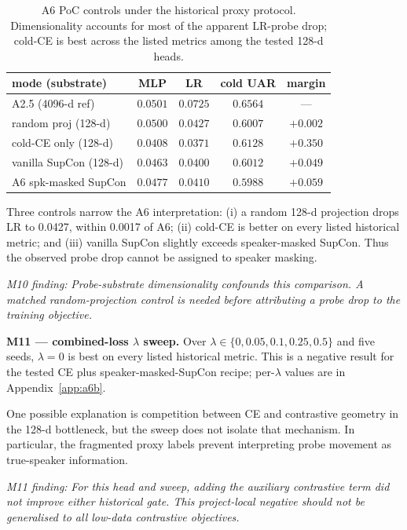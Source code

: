 \begin{table}[t]
\centering\small
\caption{A6 PoC controls under the historical proxy protocol. Dimensionality accounts for most of the apparent LR-probe drop; cold-CE is best across the listed metrics among the tested 128-d heads.}
\label{tab:a6_controls}
\begin{tabular}{lcccc}
\toprule
mode (substrate)        & MLP   & LR    & cold UAR & margin \\
\midrule
A2.5 (4096-d ref)       & $0.0501$ & $0.0725$ & $0.6564$ & --- \\
random proj (128-d)     & $0.0500$ & $0.0427$ & $0.6007$ & $+0.002$ \\
cold-CE only (128-d)    & $0.0408$ & $\mathbf{0.0371}$ & $\mathbf{0.6128}$ & $\mathbf{+0.350}$ \\
vanilla SupCon (128-d)  & $0.0463$ & $0.0400$ & $0.6012$ & $+0.049$ \\
A6 spk-masked SupCon    & $0.0477$ & $0.0410$ & $0.5988$ & $+0.059$ \\
\bottomrule
\end{tabular}
\end{table}

Three controls narrow the A6 interpretation: (i) a random 128-d projection drops LR to 0.0427, within 0.0017 of A6; (ii) cold-CE is better on every listed historical metric; and (iii) vanilla SupCon slightly exceeds speaker-masked SupCon. Thus the observed probe drop cannot be assigned to speaker masking.

\textit{M10 finding:} \emph{Probe-substrate dimensionality confounds this comparison. A matched random-projection control is needed before attributing a probe drop to the training objective.}

\textbf{M11 --- combined-loss $\lambda$ sweep.} Over $\lambda\in\{0,0.05,0.1,0.25,0.5\}$ and five seeds, $\lambda=0$ is best on every listed historical metric. This is a negative result for the tested CE plus speaker-masked-SupCon recipe; per-$\lambda$ values are in Appendix~\ref{app:a6b}.

One possible explanation is competition between CE and contrastive geometry in the 128-d bottleneck, but the sweep does not isolate that mechanism. In particular, the fragmented proxy labels prevent interpreting probe movement as true-speaker information.

\textit{M11 finding:} \emph{For this head and sweep, adding the auxiliary contrastive term did not improve either historical gate. This project-local negative should not be generalised to all low-data contrastive objectives.}

